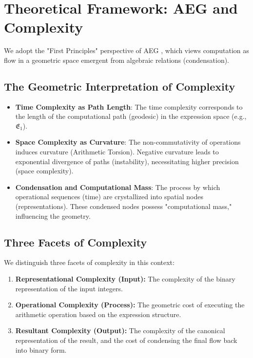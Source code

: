 \documentclass[11pt, a4paper]{article}
\begin{document}
\section{Theoretical Framework: AEG and Complexity}

We adopt the "First Principles" perspective of AEG \cite{AEG-FirstPrinciples}, which views computation as flow in a geometric space emergent from algebraic relations (condensation).

\subsection{The Geometric Interpretation of Complexity}

\begin{itemize}
    \item \textbf{Time Complexity as Path Length}: The time complexity corresponds to the length of the computational path (geodesic) in the expression space (e.g., $\mathfrak{E}_1$).
    \item \textbf{Space Complexity as Curvature}: The non-commutativity of operations induces curvature (Arithmetic Torsion). Negative curvature leads to exponential divergence of paths (instability), necessitating higher precision (space complexity).
    \item \textbf{Condensation and Computational Mass}: The process by which operational sequences (time) are crystallized into spatial nodes (representations). These condensed nodes possess "computational mass," influencing the geometry.
\end{itemize}

\subsection{Three Facets of Complexity}

We distinguish three facets of complexity in this context:

\begin{enumerate}
    \item \textbf{Representational Complexity (Input):} The complexity of the binary representation of the input integers.
    \item \textbf{Operational Complexity (Process):} The geometric cost of executing the arithmetic operation based on the expression structure.
    \item \textbf{Resultant Complexity (Output):} The complexity of the canonical representation of the result, and the cost of condensing the final flow back into binary form.
\end{enumerate}
\end{document}
